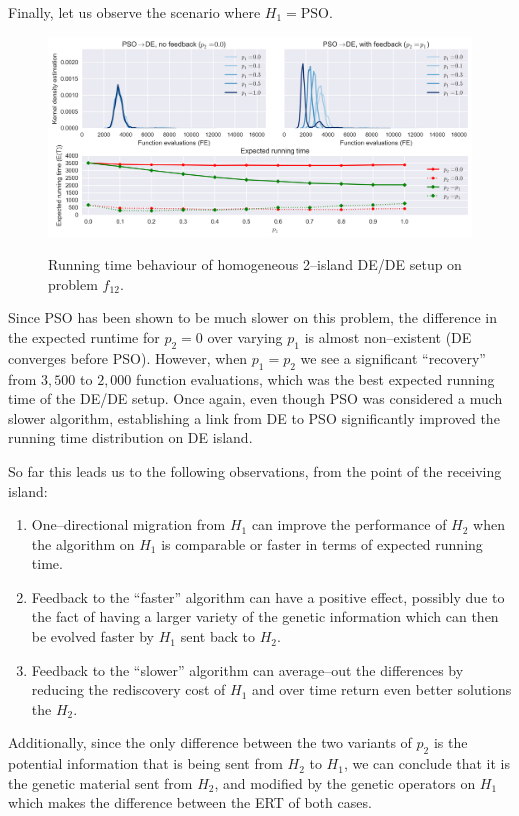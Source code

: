 \documentclass{sig-alternate}
\begin{document}
Finally, let us observe the scenario where $H_1 = \mbox{PSO}$.
\begin{figure}[ht]
  \centering
  \includegraphics[width=\columnwidth]{figures/single_pso_jde_cec_7.png}
  \label{fig:single_pso_jde_7}
 \caption{Running time behaviour of homogeneous 2--island DE/DE setup on problem $f_{12}$.}
\end{figure}
Since PSO has been shown to be much slower on this problem, the difference in the expected runtime for $p_2=0$ over varying $p_1$ is almost non--existent (DE converges before PSO).
However, when $p_1=p_2$ we see a significant ``recovery'' from $3,500$ to $2,000$ function evaluations, which was the best expected running time of the DE/DE setup.
Once again, even though PSO was considered a much slower algorithm, establishing a link from DE to PSO significantly improved the running time distribution on DE island.

So far this leads us to the following observations, from the point of the receiving island:
\begin{enumerate}
    \item One--directional migration from $H_1$ can improve the performance of $H_2$ when the algorithm on $H_1$ is comparable or faster in terms of expected running time.
    \item Feedback to the ``faster'' algorithm can have a positive effect, possibly due to the fact of having a larger variety of the genetic information which can then be evolved faster by $H_1$ sent back to $H_2$.
    \item Feedback to the ``slower'' algorithm can average--out the differences by reducing the rediscovery cost of $H_1$ and over time return even better solutions the $H_2$.
\end{enumerate}
Additionally, since the only difference between the two variants of $p_2$ is the potential information that is being sent from $H_2$ to $H_1$, we can conclude that it is the genetic material sent from $H_2$, and modified by the genetic operators on $H_1$ which makes the difference between the ERT of both cases.
\end{document}
